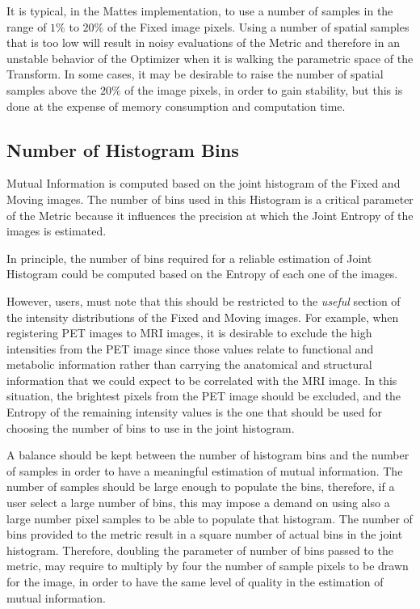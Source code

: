 \documentclass{InsightArticle}
\begin{document}
It is typical, in the Mattes implementation, to use a number of samples in the
range of $1\%$ to $20\%$ of the Fixed image pixels. Using a number of spatial
samples that is too low will result in noisy evaluations of the Metric and
therefore in an unstable behavior of the Optimizer when it is walking the
parametric space of the Transform. In some cases, it may be desirable to raise
the number of spatial samples above the $20\%$ of the image pixels, in order to
gain stability, but this is done at the expense of memory consumption and
computation time.

\subsection{Number of Histogram Bins}

Mutual Information is computed based on the joint histogram of the Fixed and
Moving images. The number of bins used in this Histogram is a critical
parameter of the Metric because it influences the precision at which the Joint
Entropy of the images is estimated.

In principle, the number of bins required for a reliable estimation of Joint 
Histogram could be computed based on the Entropy of each one of the images.

However, users, must note that this should be restricted to the \emph{useful}
section of the intensity distributions of the Fixed and Moving images. For
example, when registering PET images to MRI images, it is desirable to exclude
the high intensities from the PET image since those values relate to functional
and metabolic information rather than carrying the anatomical and structural
information that we could expect to be correlated with the MRI image. In this
situation, the brightest pixels from the PET image should be excluded, and the
Entropy of the remaining intensity values is the one that should be used for
choosing the number of bins to use in the joint histogram.

A balance should be kept between the number of histogram bins and the number of
samples in order to have a meaningful estimation of mutual information. The
number of samples should be large enough to populate the bins, therefore, if a
user select a large number of bins, this may impose a demand on using also a
large number pixel samples to be able to populate that histogram. The number of
bins provided to the metric result in a square number of actual bins in the joint
histogram. Therefore, doubling the parameter of number of bins passed to the
metric, may require to multiply by four the number of sample pixels to be drawn
for the image, in order to have the same level of quality in the estimation of
mutual information.
\end{document}
